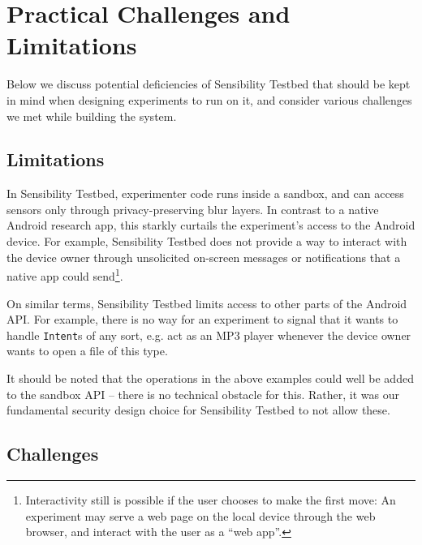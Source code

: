 \section{Practical Challenges and Limitations}\label{sec-limitation}

Below we discuss potential deficiencies of Sensibility Testbed 
that should be kept in mind when designing experiments to run on it, 
and consider various challenges we met while building the system.

\subsection{Limitations}\label{subsec-limitations}
In Sensibility Testbed, experimenter code runs inside a sandbox, and 
can access sensors only through privacy-preserving blur layers. 
In contrast to a native Android research app, this starkly curtails 
the experiment's access to the Android device. For example, Sensibility 
Testbed does not provide a way to interact with the device owner 
through unsolicited on-screen messages or notifications that a native 
app could send\footnote{Interactivity still is possible if the user 
chooses to make the first move: An experiment may serve a web page on 
the local device through the web browser, and interact with the user 
as a ``web app''.}. 

On similar terms, Sensibility Testbed limits access to other parts 
of the Android API. For example, there is no way for an experiment to 
signal that it wants to handle \texttt{Intent}s of any sort, e.g. 
act as an MP3 player whenever the device owner wants to open a file 
of this type.

It should be noted that the operations in the above examples 
could well be added to the sandbox API -- there is no technical 
obstacle for this. Rather, it was our fundamental security design 
choice for Sensibility Testbed to not allow these.


\subsection{Challenges}\label{subsec-challenges}

